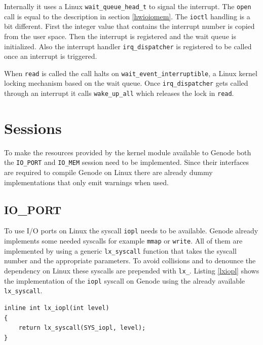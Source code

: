 \documentclass[
a4paper,
11pt,
twoside
]{report}
\begin{document}
		Internally it uses a Linux \texttt{wait\_queue\_head\_t} to signal the interrupt.
		The \texttt{open} call is equal to the description in section \ref{hwioiomem}.
		The \texttt{ioctl} handling is a bit different.
		First the integer value that contains the interrupt number is copied from the user space.
		Then the interrupt is registered and the wait queue is initialized.
		Also the interrupt handler \texttt{irq\_dispatcher} is registered to be called once an interrupt is triggered.
		
		When \texttt{read} is called the call halts on \texttt{wait\_event\_interruptible}, a Linux kernel locking mechanism based on the wait queue.
		Once \texttt{irq\_dispatcher} gets called through an interrupt it calls \texttt{wake\_up\_all} which releases the lock in \texttt{read}.
		
		\section{Sessions}
		
		To make the resources provided by the kernel module available to Genode both the \texttt{IO\_PORT} and \texttt{IO\_MEM} session need to be implemented.
		Since their interfaces are required to compile Genode on Linux there are already dummy implementations that only emit warnings when used.
		
		\subsection{IO\_PORT}
		
		To use I/O ports on Linux the syscall \texttt{iopl} \citep{iopl} needs to be available.
		Genode already implements some needed syscalls for example \texttt{mmap} or \texttt{write}.
		All of them are implemented by using a generic \texttt{lx\_syscall} function that takes the syscall number and the appropriate parameters.
		To avoid collisions and to denounce the dependency on Linux these syscalls are prepended with \texttt{lx\_}.
		Listing \ref{lxiopl} shows the implementation of the \texttt{iopl} syscall on Genode using the already available \texttt{lx\_syscall}.
		
		\begin{lstlisting}[basicstyle=\ttfamily\footnotesize]
inline int lx_iopl(int level)
{
	return lx_syscall(SYS_iopl, level);
}
		\end{lstlisting}
		
\end{document}
